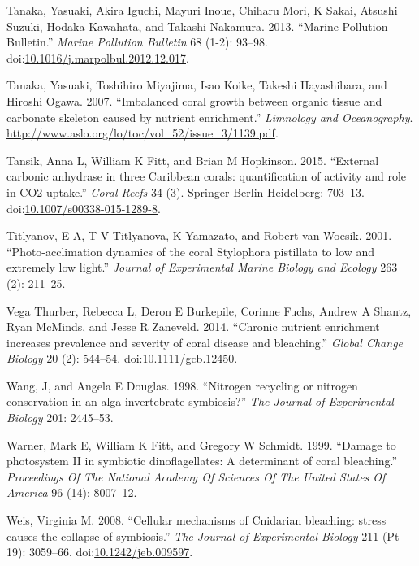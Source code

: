 \documentclass[]{elsarticle} %
\begin{document}
\hypertarget{ref-Tanaka:2013dj}{}
Tanaka, Yasuaki, Akira Iguchi, Mayuri Inoue, Chiharu Mori, K Sakai,
Atsushi Suzuki, Hodaka Kawahata, and Takashi Nakamura. 2013. ``Marine
Pollution Bulletin.'' \emph{Marine Pollution Bulletin} 68 (1-2): 93--98.
doi:\href{https://doi.org/10.1016/j.marpolbul.2012.12.017}{10.1016/j.marpolbul.2012.12.017}.

\hypertarget{ref-Tanaka:2007uv}{}
Tanaka, Yasuaki, Toshihiro Miyajima, Isao Koike, Takeshi Hayashibara,
and Hiroshi Ogawa. 2007. ``Imbalanced coral growth between organic
tissue and carbonate skeleton caused by nutrient enrichment.''
\emph{Limnology and Oceanography}.
\url{http://www.aslo.org/lo/toc/vol_52/issue_3/1139.pdf}.

\hypertarget{ref-Tansik:2015cm}{}
Tansik, Anna L, William K Fitt, and Brian M Hopkinson. 2015. ``External
carbonic anhydrase in three Caribbean corals: quantification of activity
and role in CO2 uptake.'' \emph{Coral Reefs} 34 (3). Springer Berlin
Heidelberg: 703--13.
doi:\href{https://doi.org/10.1007/s00338-015-1289-8}{10.1007/s00338-015-1289-8}.

\hypertarget{ref-Titlyanov:2001p3631}{}
Titlyanov, E A, T V Titlyanova, K Yamazato, and Robert van Woesik. 2001.
``Photo-acclimation dynamics of the coral Stylophora pistillata to low
and extremely low light.'' \emph{Journal of Experimental Marine Biology
and Ecology} 263 (2): 211--25.

\hypertarget{ref-VegaThurber:2014hk}{}
Vega Thurber, Rebecca L, Deron E Burkepile, Corinne Fuchs, Andrew A
Shantz, Ryan McMinds, and Jesse R Zaneveld. 2014. ``Chronic nutrient
enrichment increases prevalence and severity of coral disease and
bleaching.'' \emph{Global Change Biology} 20 (2): 544--54.
doi:\href{https://doi.org/10.1111/gcb.12450}{10.1111/gcb.12450}.

\hypertarget{ref-Wang:1998p128}{}
Wang, J, and Angela E Douglas. 1998. ``Nitrogen recycling or nitrogen
conservation in an alga-invertebrate symbiosis?'' \emph{The Journal of
Experimental Biology} 201: 2445--53.

\hypertarget{ref-Warner:1999p4239}{}
Warner, Mark E, William K Fitt, and Gregory W Schmidt. 1999. ``Damage to
photosystem II in symbiotic dinoflagellates: A determinant of coral
bleaching.'' \emph{Proceedings Of The National Academy Of Sciences Of
The United States Of America} 96 (14): 8007--12.

\hypertarget{ref-Weis:2008p944}{}
Weis, Virginia M. 2008. ``Cellular mechanisms of Cnidarian bleaching:
stress causes the collapse of symbiosis.'' \emph{The Journal of
Experimental Biology} 211 (Pt 19): 3059--66.
doi:\href{https://doi.org/10.1242/jeb.009597}{10.1242/jeb.009597}.
\end{document}
